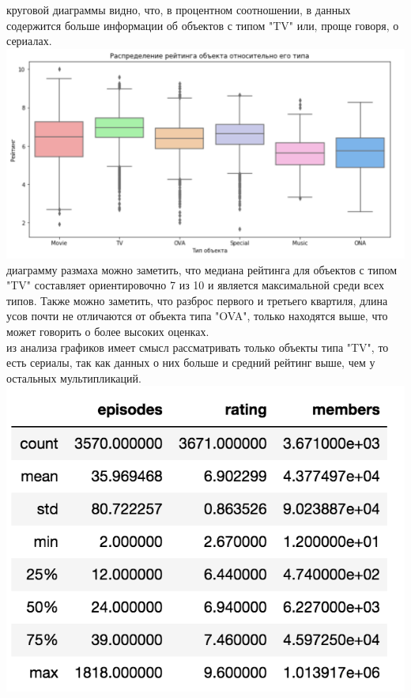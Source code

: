 \documentclass{article}
\newcommand\tab[1][1cm]{\hspace*{#1}}
\begin{document}
 круговой диаграммы видно, что, в процентном соотношении, в данных содержится больше информации об объектов с типом "TV" или, проще говоря, о сериалах.\\
\includegraphics[scale=0.7]{f4.png}\\
 диаграмму размаха можно заметить, что медиана рейтинга для объектов с типом "TV" составляет ориентировочно 7 из 10 и является максимальной среди всех типов. Также можно заметить, что разброс первого и третьего квартиля, длина усов почти не отличаются от объекта типа "OVA", только находятся выше, что может говорить о более высоких оценках.\\
 из анализа графиков имеет смысл рассматривать только объекты типа "TV", то есть сериалы, так как данных о них больше и средний рейтинг выше, чем у остальных мультипликаций.\\
\includegraphics[scale=0.8]{f5.png}\\
\end{document}
